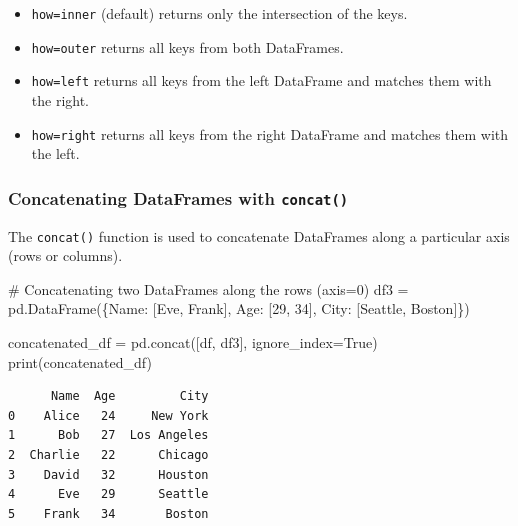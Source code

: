 \documentclass[
  letterpaper,
  DIV=11,
  numbers=noendperiod]{scrreprt}
\newenvironment{Shaded}{\begin{snugshade}}{\end{snugshade}}
\newcommand{\BuiltInTok}[1]{\textcolor[rgb]{0.00,0.23,0.31}{#1}}
\newcommand{\CommentTok}[1]{\textcolor[rgb]{0.37,0.37,0.37}{#1}}
\newcommand{\DecValTok}[1]{\textcolor[rgb]{0.68,0.00,0.00}{#1}}
\newcommand{\NormalTok}[1]{\textcolor[rgb]{0.00,0.23,0.31}{#1}}
\newcommand{\OperatorTok}[1]{\textcolor[rgb]{0.37,0.37,0.37}{#1}}
\newcommand{\StringTok}[1]{\textcolor[rgb]{0.13,0.47,0.30}{#1}}
\newcommand{\VariableTok}[1]{\textcolor[rgb]{0.07,0.07,0.07}{#1}}
\providecommand{\tightlist}{%
  \setlength{\itemsep}{0pt}\setlength{\parskip}{0pt}}\usepackage{longtable,booktabs,array}
\begin{document}
\begin{itemize}
\tightlist
\item
  \texttt{how=\textquotesingle{}inner\textquotesingle{}} (default)
  returns only the intersection of the keys.
\item
  \texttt{how=\textquotesingle{}outer\textquotesingle{}} returns all
  keys from both DataFrames.
\item
  \texttt{how=\textquotesingle{}left\textquotesingle{}} returns all keys
  from the left DataFrame and matches them with the right.
\item
  \texttt{how=\textquotesingle{}right\textquotesingle{}} returns all
  keys from the right DataFrame and matches them with the left.
\end{itemize}

\hypertarget{concatenating-dataframes-with-concat}{%
\subsubsection{\texorpdfstring{Concatenating DataFrames with
\texttt{concat()}}{Concatenating DataFrames with concat()}}\label{concatenating-dataframes-with-concat}}

The \texttt{concat()} function is used to concatenate DataFrames along a
particular axis (rows or columns).

\begin{Shaded}
\begin{Highlighting}[]
\CommentTok{\# Concatenating two DataFrames along the rows (axis=0)}
\NormalTok{df3 }\OperatorTok{=}\NormalTok{ pd.DataFrame(\{}\StringTok{\textquotesingle{}Name\textquotesingle{}}\NormalTok{: [}\StringTok{\textquotesingle{}Eve\textquotesingle{}}\NormalTok{, }\StringTok{\textquotesingle{}Frank\textquotesingle{}}\NormalTok{],}
                    \StringTok{\textquotesingle{}Age\textquotesingle{}}\NormalTok{: [}\DecValTok{29}\NormalTok{, }\DecValTok{34}\NormalTok{],}
                    \StringTok{\textquotesingle{}City\textquotesingle{}}\NormalTok{: [}\StringTok{\textquotesingle{}Seattle\textquotesingle{}}\NormalTok{, }\StringTok{\textquotesingle{}Boston\textquotesingle{}}\NormalTok{]\})}

\NormalTok{concatenated\_df }\OperatorTok{=}\NormalTok{ pd.concat([df, df3], ignore\_index}\OperatorTok{=}\VariableTok{True}\NormalTok{)}
\BuiltInTok{print}\NormalTok{(concatenated\_df)}
\end{Highlighting}
\end{Shaded}

\begin{verbatim}
      Name  Age         City
0    Alice   24     New York
1      Bob   27  Los Angeles
2  Charlie   22      Chicago
3    David   32      Houston
4      Eve   29      Seattle
5    Frank   34       Boston
\end{verbatim}
\end{document}
